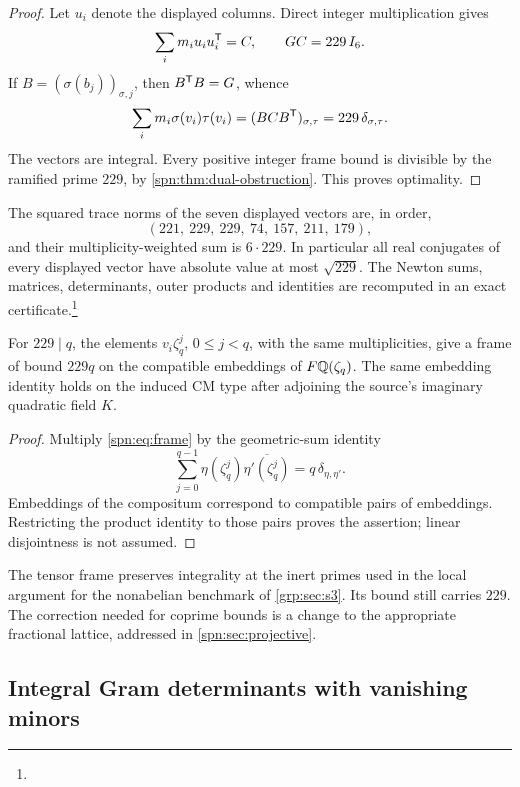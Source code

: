 \begin{proof}
Let $u_i$ denote the displayed columns. Direct integer multiplication gives
\[
 \sum_im_iu_iu_i^{\mathsf{T}}=C,\qquad GC=229\,I_6 .
\]
If $B=(\sigma(b_j))_{\sigma,j}$, then $B^{\mathsf{T}}B=G$, whence
\[
 \sum_im_i\sigma(v_i)\tau(v_i)=(BCB^{\mathsf{T}})_{\sigma,\tau}
 =229\,\delta_{\sigma,\tau}.
\]
The vectors are integral. Every positive integer frame bound is divisible by
the ramified prime $229$, by \cref{spn:thm:dual-obstruction}. This proves
optimality.
\end{proof}

The squared trace norms of the seven displayed vectors are, in order,
\[
 (221,\ 229,\ 229,\ 74,\ 157,\ 211,\ 179),
\]
and their multiplicity-weighted sum is $6\cdot229$. In particular all real
conjugates of every displayed vector have absolute value at most
$\sqrt{229}$. The Newton sums, matrices, determinants, outer products and
identities are recomputed in an exact
certificate.\footnote{}

\begin{corollary}\label{spn:cor:tensor}
For $229\mid q$, the elements $v_i\zeta_q^j$, $0\le j<q$, with the same
multiplicities, give a frame of bound $229q$ on the compatible embeddings of
$F\mathbb{Q}(\zeta_q)$. The same embedding identity holds on the induced CM type after
adjoining the source's imaginary quadratic field $K$.
\end{corollary}

\begin{proof}
Multiply \eqref{spn:eq:frame} by the geometric-sum identity
\[
 \sum_{j=0}^{q-1}\eta(\zeta_q^j)\overline{\eta'(\zeta_q^j)}
 =q\,\delta_{\eta,\eta'} .
\]
Embeddings of the compositum correspond to compatible pairs of embeddings.
Restricting the product identity to those pairs proves the assertion; linear
disjointness is not assumed.
\end{proof}

The tensor frame preserves integrality at the inert primes used in the local
argument for the nonabelian benchmark of \cref{grp:sec:s3}. Its bound still
carries $229$. The correction needed for coprime bounds is a change to the
appropriate fractional lattice, addressed in \cref{spn:sec:projective}.


\subsection{Integral Gram determinants with vanishing minors}\label{src:sec:gram}
\begingroup\raggedright
{}
\endgroup

